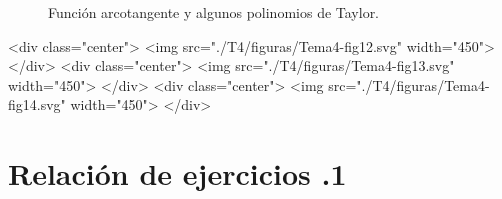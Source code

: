 \begin{latexonly}
\begin{figure}
\begin{center}
\end{center}
\caption{Función arcotangente y algunos polinomios de Taylor.}\label{fig:tgtaylor}
\end{figure}
\end{latexonly}
\begin{rawhtml}
<div class="center">
<img src="./T4/figuras/Tema4-fig12.svg" width="450">
</div>
<div class="center">
<img src="./T4/figuras/Tema4-fig13.svg" width="450">
</div>
<div class="center">
<img src="./T4/figuras/Tema4-fig14.svg" width="450">
</div>
\end{rawhtml}

\newpage


\section*{Relación de ejercicios \thechapter.1}

\pagestyle{relaciones}

